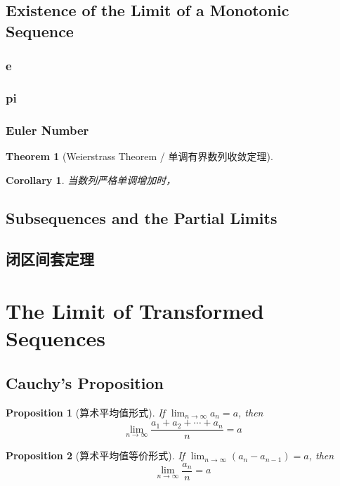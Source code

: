 \documentclass[onecolumn]{ctexart}
\newtheorem{theorem}{Theorem}
\newtheorem{proposition}{Proposition}
\newtheorem{corollary}{Corollary}
\begin{document}
\subsection{Existence of the Limit of a Monotonic Sequence}

\subsubsection{e}

\subsubsection{pi}

\subsubsection{Euler Number}

\begin{theorem}[Weierstrass Theorem / 单调有界数列收敛定理]
  
\end{theorem}

\begin{corollary}
  当数列严格单调增加时，
\end{corollary}

\subsection{Subsequences and the Partial Limits}

\subsection{闭区间套定理}

\section{The Limit of Transformed Sequences}

\subsection{Cauchy's Proposition}

\begin{proposition}[算术平均值形式]
  If $\lim_{n \to \infty} a_n = a$, then
  \[
    \lim_{n \to \infty} \frac{a_1 + a_2 + \cdots + a_n}{n} = a
  \]
\end{proposition}

\begin{proposition}[算术平均值等价形式]
  If $\lim_{n \to \infty} (a_n - a_{n-1}) = a$, then
  \[
    \lim_{n \to \infty} \frac{a_n}{n} = a
  \]
\end{proposition}
\end{document}
